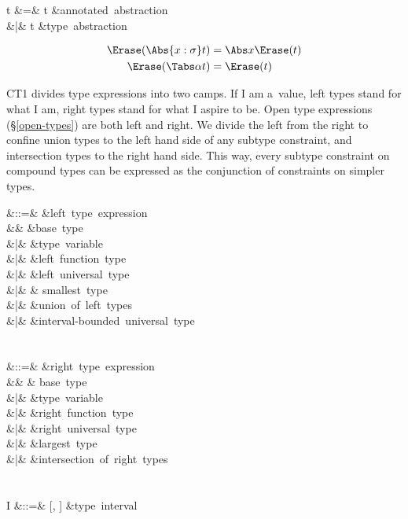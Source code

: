 \documentclass{amsart}
\begin{document}

\begin{syntax}
t &\+=& t &\mbox{annotated abstraction}\\
&|& \Tabs\alpha t &\mbox{type abstraction}
\end{syntax}%

\begin{align*}
\Erase(\Abs{x:\sigma}t) & = \Abs x\Erase(t)\\
\Erase(\Tabs\alpha t) &= \Erase(t)
\end{align*}


CT1 divides type expressions into two camps. If I am a~value,
left types stand for what I am, right types stand for what I
aspire to be. Open type expressions (\S\ref{open-types}) are both
left and right. We divide the left from the right to confine
union types to the left hand side of any subtype constraint, and
intersection types to the right hand side. This way, every
subtype constraint on compound types can be expressed as the
conjunction of constraints on simpler types.

\begin{syntax}
\rho &::=& &\mbox{left type expression}\\
&& \iota &\mbox{base type}\\
&|& \alpha &\mbox{type variable}\\
&|& \tau \R \rho &\mbox{left function type}\\
&|& \All\alpha\rho &\mbox{left universal type}\\
&|& \Bot & \mbox{smallest type}\\
&|& \rho\cup\rho &\mbox{union of left types}\\
&|& \rho &\mbox{interval-bounded universal type}\\
\\\\
\tau &::=& &\mbox{right type expression}\\
&& \iota & \mbox{base type}\\
&|& \alpha &\mbox{type variable}\\
&|& \rho \R \tau &\mbox{right function type}\\
&|& \All\alpha\tau &\mbox{right universal type}\\
&|& \Top &\mbox{largest type}\\
&|& \tau\cap\tau &\mbox{intersection of right types}\\
\\\\
I &::=& [\rho, \tau] &\mbox{type interval}
\end{syntax}%
\end{document}
